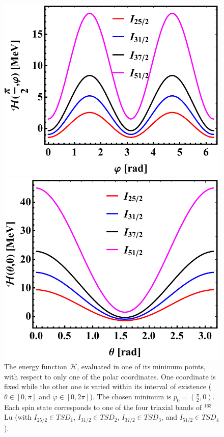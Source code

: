 \documentclass[myclassdoc,debug]{rjparticle}
\begin{document}
\begin{figure}
\centering
\begin{minipage}{.5\textwidth}
  \centering
  \includegraphics[scale=0.48]{figs/energyFunction_minTheta.pdf}
\end{minipage}%
\begin{minipage}{.5\textwidth}
  \centering
 \includegraphics[scale=0.45]{figs/energyFunction_minVarphi.pdf}
\end{minipage}
\caption{The energy function $\mathcal{H}$, evaluated in one of its minimum points, with respect to only one of the polar coordinates. One coordinate is fixed while the other one is varied within its interval of existence ($\theta\in[0,\pi]$ and $\varphi\in[0,2\pi]$). The chosen minimum is $p_0=\left(\frac{\pi}{2},0\right)$. Each spin state corresponds to one of the four triaxial bands of $^{163}$Lu (with $I_{25/2}\in TSD_1$, $I_{31/2}\in TSD_2$, $I_{37/2}\in TSD_3$, and $I_{51/2}\in TSD_4$).}
    \label{energy-function-min-point-evolution}
\end{figure}
\end{document}
